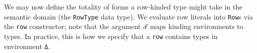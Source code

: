 \documentclass[authoryear, acmsmall, screen, review, nonacm]{acmart}
\begin{document}
\Ni We may now define the totality of forms a row-kinded type might take in the semantic domain (the \verb!RowType! data type). We evaluate row literals into \verb!Row!s via the \verb!row! constructor; note that the argument \verb!𝒯! maps kinding environments to types. In practice, this is how we specify that a \verb!row! contains types in environment \verb!Δ!. 

\begin{code}%
\>[0]\AgdaSpace{}%
\AgdaSpace{}%
\AgdaSymbol{(}\AgdaSpace{}%
\AgdaSymbol{:}\AgdaSpace{}%
\AgdaSymbol{)}\AgdaSpace{}%
\AgdaSymbol{(}\AgdaSpace{}%
\AgdaSymbol{:}\AgdaSpace{}%
\AgdaSpace{}%
\AgdaSpace{}%
\AgdaSymbol{)}\AgdaSpace{}%
\AgdaSymbol{:}\AgdaSpace{}%
\AgdaSpace{}%
\AgdaSpace{}%
\<%
\\
\>[0]\AgdaSpace{}%
\AgdaSymbol{:}\AgdaSpace{}%
\AgdaSpace{}%
\AgdaSymbol{\{}\AgdaSpace{}%
\AgdaSymbol{:}\AgdaSpace{}%
\AgdaSymbol{\}}\AgdaSpace{}%
\AgdaSymbol{\{}\AgdaSpace{}%
\AgdaSymbol{:}\AgdaSpace{}%
\AgdaSpace{}%
\AgdaSpace{}%
\AgdaSymbol{\}}\AgdaSpace{}%
\AgdaSpace{}%
\AgdaSpace{}%
\AgdaSpace{}%
\AgdaSpace{}%
\AgdaOperator{\AgdaInductiveConstructor{R[}}\AgdaSpace{}%
\AgdaSpace{}%
\AgdaOperator{\AgdaInductiveConstructor{]}}\AgdaSpace{}%
\AgdaSpace{}%
\<%
\\
%
\\[\AgdaEmptyExtraSkip]%
\>[0]\AgdaSpace{}%
\AgdaSpace{}%
\AgdaSpace{}%
\AgdaSpace{}%
\<%
\\
\>[0][@{}l@{\AgdaIndent{0}}]%
\>[2]\AgdaSpace{}%
\AgdaSymbol{:}\AgdaSpace{}%
\AgdaSymbol{(}\AgdaSpace{}%
\AgdaSymbol{:}\AgdaSpace{}%
\AgdaSpace{}%
\AgdaSymbol{(}\AgdaSpace{}%
\AgdaSymbol{))}\AgdaSpace{}%
\AgdaSpace{}%
\AgdaSpace{}%
\AgdaSpace{}%
\AgdaSpace{}%
\AgdaSpace{}%
\AgdaSpace{}%
\AgdaSpace{}%
\AgdaOperator{\AgdaInductiveConstructor{R[}}\AgdaSpace{}%
\AgdaSpace{}%
\AgdaOperator{\AgdaInductiveConstructor{]}}\<%
\end{code}
\end{document}
